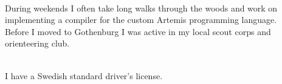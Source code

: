 \documentclass[9pt]{developercv}
\begin{document}
\hfill
\begin{minipage}[t]{0.4\textwidth}
	\vspace{-\baselineskip}
	\\During weekends I often take long walks through the woods and work
	on implementing a compiler for the custom Artemis programming language.
	\\Before I moved to Gothenburg I was active in my local scout corps and
	orienteering club.
\end{minipage}
\hfill
\begin{minipage}[t]{0.3\textwidth}
	\vspace{-\baselineskip}
	\\I have a Swedish standard driver's license.
\end{minipage}
\end{document}
